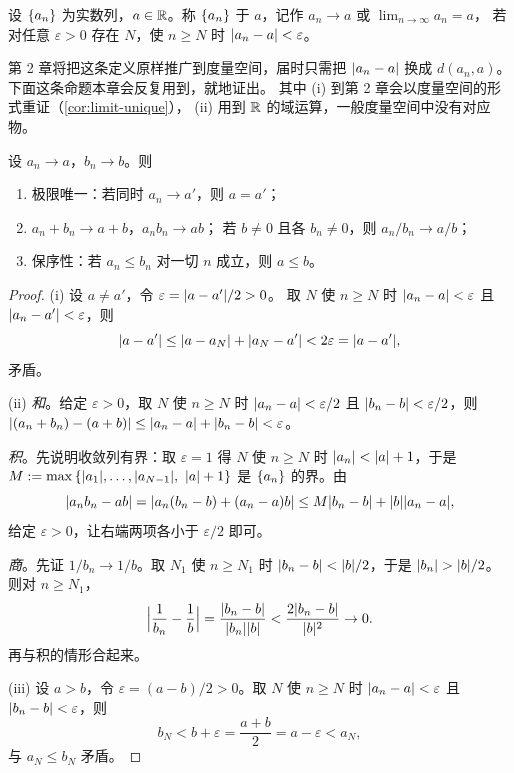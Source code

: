 \begin{definition}[数列收敛]
  \label{def:seq-limit-R}
  设 \(\seq{a_{n}}\) 为实数列，\(a \in \R\)。称 \(\seq{a_{n}}\) 
  于 \(a\)，记作 \(a_{n} \to a\) 或 \(\lim_{n \to \infty} a_{n} = a\)，
  若对任意 \(\varepsilon > 0\) 存在 \(N\)，使 \(n \ge N\) 时 \(\abs{a_{n}-a} < \varepsilon\)。
\end{definition}

第 2 章将把这条定义原样推广到度量空间，届时只需把 \(\abs{a_{n}-a}\)
换成 \(d(a_{n},a)\)。下面这条命题本章会反复用到，就地证出。
其中 (i) 到第 2 章会以度量空间的形式重证（\cref{cor:limit-unique}），
(ii) 用到 \(\R\) 的域运算，一般度量空间中没有对应物。

\begin{proposition}[极限唯一与四则运算]
  \label{prop:limit-basics}
  设 \(a_{n} \to a\)，\(b_{n} \to b\)。则
  \begin{enumerate}[label=(\roman*)]
    \item 极限唯一：若同时 \(a_{n} \to a'\)，则 \(a = a'\)；
    \item \(a_{n} + b_{n} \to a + b\)，\(a_{n}b_{n} \to ab\)；
          若 \(b \neq 0\) 且各 \(b_{n} \neq 0\)，则 \(a_{n}/b_{n} \to a/b\)；
    \item 保序性：若 \(a_{n} \le b_{n}\) 对一切 \(n\) 成立，则 \(a \le b\)。
  \end{enumerate}
\end{proposition}

\begin{proof}
  (i) 设 \(a \neq a'\)，令 \(\varepsilon = \abs{a-a'}/2 > 0\)。
  取 \(N\) 使 \(n \ge N\) 时 \(\abs{a_{n}-a} < \varepsilon\) 且 \(\abs{a_{n}-a'} < \varepsilon\)，则
  \[
    \abs{a-a'} \le \abs{a-a_{N}} + \abs{a_{N}-a'} < 2\varepsilon = \abs{a-a'} ,
  \]
  矛盾。

  (ii) \emph{和}。给定 \(\varepsilon>0\)，取 \(N\) 使 \(n \ge N\) 时
  \(\abs{a_{n}-a}<\varepsilon/2\) 且 \(\abs{b_{n}-b}<\varepsilon/2\)，则
  \(\abs{(a_{n}+b_{n})-(a+b)} \le \abs{a_{n}-a}+\abs{b_{n}-b} < \varepsilon\)。

  \emph{积}。先说明收敛列有界：取 \(\varepsilon=1\) 得 \(N\) 使 \(n \ge N\) 时
  \(\abs{a_{n}} < \abs{a}+1\)，于是
  \(M := \max\set{\abs{a_{1}},\dots,\abs{a_{N-1}},\ \abs{a}+1}\) 是 \(\seq{a_{n}}\) 的界。由
  \[
    \abs{a_{n}b_{n}-ab} = \abs{a_{n}(b_{n}-b) + (a_{n}-a)b}
      \le M\abs{b_{n}-b} + \abs{b}\abs{a_{n}-a} ,
  \]
  给定 \(\varepsilon>0\)，让右端两项各小于 \(\varepsilon/2\) 即可。

  \emph{商}。先证 \(1/b_{n} \to 1/b\)。取 \(N_{1}\) 使 \(n \ge N_{1}\) 时
  \(\abs{b_{n}-b} < \abs{b}/2\)，于是 \(\abs{b_{n}} > \abs{b}/2\)。则对 \(n \ge N_{1}\)，
  \[
    \abs[\Big]{\frac{1}{b_{n}} - \frac{1}{b}}
      = \frac{\abs{b_{n}-b}}{\abs{b_{n}}\abs{b}}
      < \frac{2\abs{b_{n}-b}}{\abs{b}^{2}} \to 0 .
  \]
  再与积的情形合起来。

  (iii) 设 \(a > b\)，令 \(\varepsilon = (a-b)/2 > 0\)。取 \(N\) 使 \(n \ge N\) 时
  \(\abs{a_{n}-a}<\varepsilon\) 且 \(\abs{b_{n}-b}<\varepsilon\)，则
  \[
    b_{N} < b + \varepsilon = \frac{a+b}{2} = a - \varepsilon < a_{N} ,
  \]
  与 \(a_{N} \le b_{N}\) 矛盾。
\end{proof}

